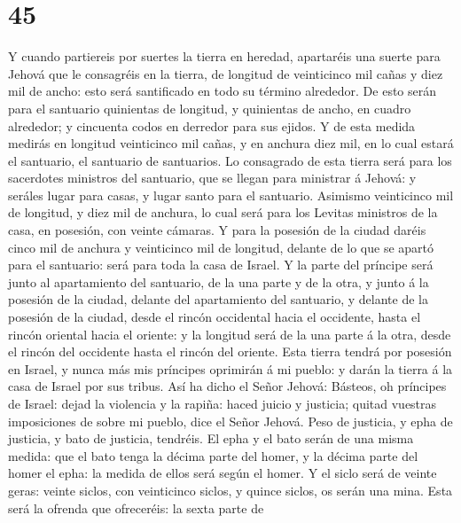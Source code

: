 \hypertarget{section-44}{%
\section{45}\label{section-44}}

 Y cuando partiereis por suertes la tierra en heredad,
apartaréis una suerte para Jehová que le consagréis en la tierra, de
longitud de veinticinco mil cañas y diez mil de ancho: esto será
santificado en todo su término alrededor.  De esto serán
para el santuario quinientas de longitud, y quinientas de ancho, en
cuadro alrededor; y cincuenta codos en derredor para sus ejidos.
 Y de esta medida medirás en longitud veinticinco mil
cañas, y en anchura diez mil, en lo cual estará el santuario, el
santuario de santuarios.  Lo consagrado de esta tierra
será para los sacerdotes ministros del santuario, que se llegan para
ministrar á Jehová: y seráles lugar para casas, y lugar santo para el
santuario.  Asimismo veinticinco mil de longitud, y diez
mil de anchura, lo cual será para los Levitas ministros de la casa, en
posesión, con veinte cámaras.  Y para la posesión de la
ciudad daréis cinco mil de anchura y veinticinco mil de longitud,
delante de lo que se apartó para el santuario: será para toda la casa de
Israel.  Y la parte del príncipe será junto al
apartamiento del santuario, de la una parte y de la otra, y junto á la
posesión de la ciudad, delante del apartamiento del santuario, y delante
de la posesión de la ciudad, desde el rincón occidental hacia el
occidente, hasta el rincón oriental hacia el oriente: y la longitud será
de la una parte á la otra, desde el rincón del occidente hasta el rincón
del oriente.  Esta tierra tendrá por posesión en Israel, y
nunca más mis príncipes oprimirán á mi pueblo: y darán la tierra á la
casa de Israel por sus tribus.  Así ha dicho el Señor
Jehová: Básteos, oh príncipes de Israel: dejad la violencia y la rapiña:
haced juicio y justicia; quitad vuestras imposiciones de sobre mi
pueblo, dice el Señor Jehová.  Peso de justicia, y epha
de justicia, y bato de justicia, tendréis.  El epha y el
bato serán de una misma medida: que el bato tenga la décima parte del
homer, y la décima parte del homer el epha: la medida de ellos será
según el homer.  Y el siclo será de veinte geras: veinte
siclos, con veinticinco siclos, y quince siclos, os serán una mina.
 Esta será la ofrenda que ofreceréis: la sexta parte de
